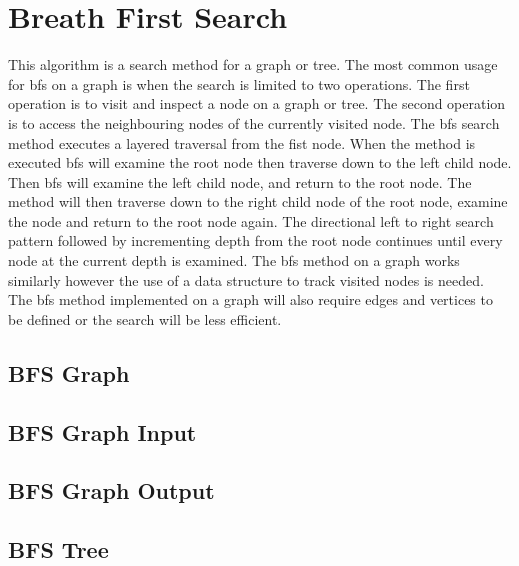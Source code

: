 \section{Breath First Search}
This algorithm is a search method for a graph or tree. 
The most common usage for bfs on a graph is when the search is limited to two operations. 
The first operation is to visit and inspect a node on a graph or tree.
The second operation is to access the neighbouring nodes of the currently visited node.
The bfs search method executes a layered traversal from the fist node.
When the method is executed bfs will examine the root node then traverse down to the left child node.
Then bfs will examine the left child node, and return to the root node.
The method will then traverse down to the right child node of the root node, examine the node and return to the root node again.
The directional left to right search pattern followed by incrementing depth from the root node continues until every node at the current depth is examined.
The bfs method on a graph works similarly however the use of a data structure to track visited nodes is needed.
The bfs method implemented on a graph will also require edges and vertices to be defined or the search will be less efficient. 

  

\subsection{BFS Graph}

\subsection{BFS Graph Input}

\subsection{BFS Graph Output}

\subsection{BFS Tree}

